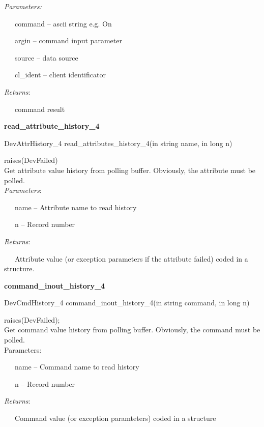 \emph{Parameters:}

~~~command – ascii string e.g. \textquotedbl{}On\textquotedbl{}

~~~argin – command input parameter

~~~source – data source

~~~cl\_ident – client identificator

\emph{Returns}:

~~~command result\\

\begin{flushleft}
\textbf{read\_attribute\_history\_4}
\par\end{flushleft}

DevAttrHistory\_4 read\_attributes\_history\_4(in string name, in
long n)

raises(DevFailed)\\

Get attribute value history from polling buffer. Obviously, the attribute
must be polled.\\

\emph{Parameters}:

~~~name – Attribute name to read history

~~~n – Record number

\emph{Returns}:

~~~Attribute value (or exception parameters if the attribute failed)
coded in a structure.\\

\begin{flushleft}
\textbf{command\_inout\_history\_4}
\par\end{flushleft}

DevCmdHistory\_4 command\_inout\_history\_4(in string command, in
long n)

raises(DevFailed);\\

Get command value history from polling buffer. Obviously, the command
must be polled.\\

Parameters:

~~~name – Command name to read history

~~~n – Record number

\emph{Returns}:

~~~Command value (or exception paramteters) coded in a structure\\

